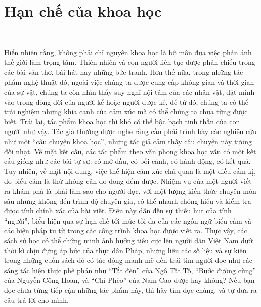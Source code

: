 \section{Hạn chế của khoa học}

\

Hiển nhiên rằng, không phải chỉ nguyên khoa học là bộ môn đưa việc phản ánh thế giới làm trọng tâm. Thiên nhiên và con người liên tục được phản chiếu trong các bài văn thơ, bài hát hay những bức tranh. Hơn thế nữa, trong những tác phẩm nghệ thuật đó, ngoài việc chúng ta được cung cấp không gian và thời gian của sự vật, chúng ta còn nhìn thấy suy nghĩ nội tâm của các nhân vật, đặt mình vào trong dòng đời của người kể hoặc người được kể, để từ đó, chúng ta có thể trải nghiệm những khía cạnh của cảm xúc mà có thể chúng ta chưa từng được biết. Trái lại, tác phẩm khoa học thì khó có thể bộc bạch tinh thần của con người như vậy. Tác giả thường được nghe rằng cần phải trình bày các nghiên cứu như một ``câu chuyện khoa học'', nhưng tác giả cảm thấy câu chuyện này tương đối nhạt. Về mặt kết cấu, các tác phẩm theo văn phong khoa học vẫn có một kết cấu giống như các bài tự sự: có mở đầu, có bối cảnh, có hành động, có kết quả. Tuy nhiên, về mặt nội dung, việc thể hiện cảm xúc chủ quan là một điều cấm kị, do biểu cảm là thứ không cân đo đong đếm được. Nhiệm vụ của một người viết ra khám phá là phải làm sao cho người đọc, với một lượng kiến thức chuyên môn sâu nhưng không đến trình độ chuyên gia, có thể nhanh chóng hiểu và kiểm tra được tính chính xác của bài viết. Điều này dẫn đến sự thiếu hụt của tính ``người'', biểu hiện qua sự hạn chế tới mức tối đa của các ngôn ngữ biểu cảm và các biện pháp tu từ trong các công trình khoa học được viết ra. Thực vậy, các sách sử học có thể chứng minh ảnh hưởng tiêu cực lên người dân Việt Nam dưới thời kì chịu đựng áp bức của thực dân Pháp, nhưng liệu các số liệu và sự kiện trong những cuốn sách đó có tác động mạnh mẽ đến trái tim người đọc như các sáng tác hiện thực phê phán như ``Tắt đèn'' của Ngô Tất Tố, ``Bước đường cùng'' của Nguyễn Công Hoan, và ``Chí Phèo'' của Nam Cao được hay không? Nếu bạn đọc chưa từng tiếp cận những tác phẩm này, thì hãy tìm đọc chúng, và tự đưa ra câu trả lời cho mình.

